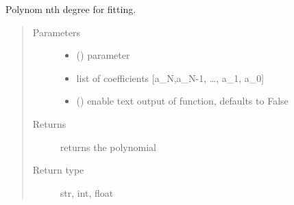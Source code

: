 \documentclass[letterpaper,10pt,english]{sphinxmanual}
\begin{document}

\begin{fulllineitems}
\label{\detokenize{fit-functions:fit_functions.poly}}
Polynom nth degree for fitting.
\begin{quote}\begin{description}
\item[{Parameters}] \leavevmode\begin{itemize}
\item {} 
 (\sphinxstyleliteralemphasis{\sphinxupquote{, }}) \textendash{} parameter

\item {} 
 \textendash{} 
list of coefficients {[}a\_N,a\_N-1, …, a\_1, a\_0{]}


\item {} 
 (\sphinxstyleliteralemphasis{\sphinxupquote{, }}) \textendash{} enable text output of function, defaults to False

\end{itemize}

\item[{Returns}] \leavevmode
returns the polynomial

\item[{Return type}] \leavevmode
str, int, float

\end{description}\end{quote}

\begin{sphinxVerbatim}[commandchars=\\\{\}]
  
\end{sphinxVerbatim}


\end{fulllineitems}
\end{document}
